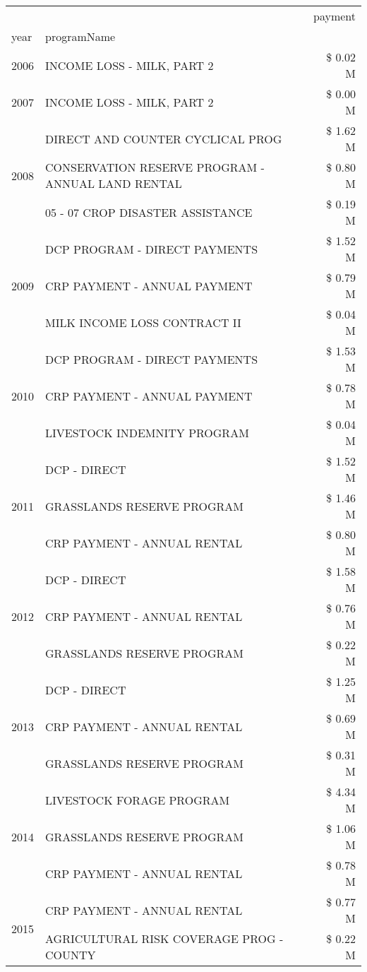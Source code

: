 \begin{tabular}{llr}
\toprule
 &  & payment \\
year & programName &  \\
\midrule
2006 & INCOME LOSS - MILK, PART 2 & \$ 0.02 M \\
\cline{1-3}
2007 & INCOME LOSS - MILK, PART 2 & \$ 0.00 M \\
\cline{1-3}
\multirow[t]{3}{*}{2008} & DIRECT AND COUNTER CYCLICAL PROG & \$ 1.62 M \\
 & CONSERVATION RESERVE PROGRAM - ANNUAL LAND RENTAL & \$ 0.80 M \\
 & 05 - 07 CROP DISASTER ASSISTANCE & \$ 0.19 M \\
\cline{1-3}
\multirow[t]{3}{*}{2009} & DCP PROGRAM - DIRECT PAYMENTS & \$ 1.52 M \\
 & CRP PAYMENT - ANNUAL PAYMENT & \$ 0.79 M \\
 & MILK INCOME LOSS CONTRACT II & \$ 0.04 M \\
\cline{1-3}
\multirow[t]{3}{*}{2010} & DCP PROGRAM - DIRECT PAYMENTS & \$ 1.53 M \\
 & CRP PAYMENT - ANNUAL PAYMENT & \$ 0.78 M \\
 & LIVESTOCK INDEMNITY PROGRAM & \$ 0.04 M \\
\cline{1-3}
\multirow[t]{3}{*}{2011} & DCP - DIRECT & \$ 1.52 M \\
 & GRASSLANDS RESERVE PROGRAM & \$ 1.46 M \\
 & CRP PAYMENT - ANNUAL RENTAL & \$ 0.80 M \\
\cline{1-3}
\multirow[t]{3}{*}{2012} & DCP - DIRECT & \$ 1.58 M \\
 & CRP PAYMENT - ANNUAL RENTAL & \$ 0.76 M \\
 & GRASSLANDS RESERVE PROGRAM & \$ 0.22 M \\
\cline{1-3}
\multirow[t]{3}{*}{2013} & DCP - DIRECT & \$ 1.25 M \\
 & CRP PAYMENT - ANNUAL RENTAL & \$ 0.69 M \\
 & GRASSLANDS RESERVE PROGRAM & \$ 0.31 M \\
\cline{1-3}
\multirow[t]{3}{*}{2014} & LIVESTOCK FORAGE PROGRAM & \$ 4.34 M \\
 & GRASSLANDS RESERVE PROGRAM & \$ 1.06 M \\
 & CRP PAYMENT - ANNUAL RENTAL & \$ 0.78 M \\
\cline{1-3}
\multirow[t]{3}{*}{2015} & CRP PAYMENT - ANNUAL RENTAL & \$ 0.77 M \\
 & AGRICULTURAL RISK COVERAGE PROG - COUNTY & \$ 0.22 M \\

\end{tabular}

